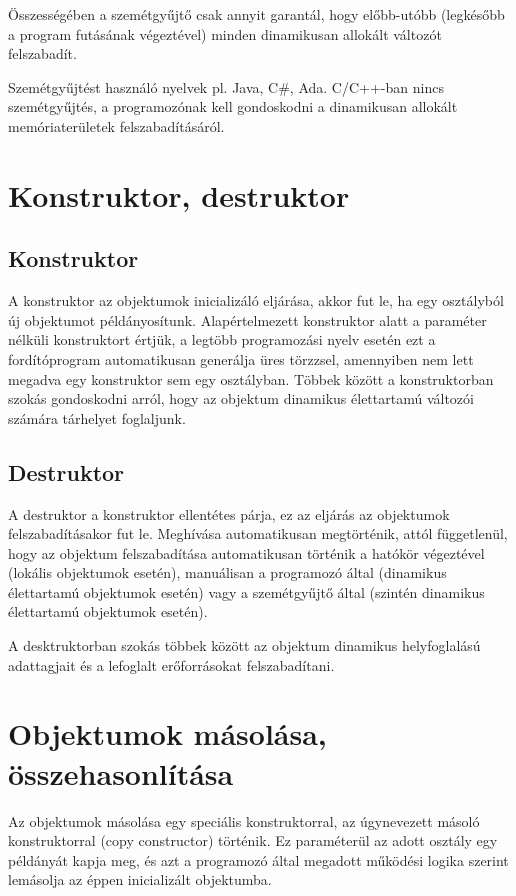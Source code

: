 \documentclass[margin=0px]{article}
\begin{document}
	Összességében a szemétgyűjtő csak annyit garantál, hogy előbb-utóbb (legkésőbb a program futásának végeztével) minden dinamikusan allokált változót felszabadít.
	
	Szemétgyűjtést használó nyelvek pl. Java, C\#, Ada. C/C++-ban nincs szemétgyűjtés, a programozónak kell gondoskodni a dinamikusan allokált memóriaterületek felszabadításáról.
	\section{Konstruktor, destruktor}

	\subsection{Konstruktor}
	
	A konstruktor az objektumok inicializáló eljárása, akkor fut le, ha egy osztályból új objektumot példányosítunk. Alapértelmezett konstruktor alatt a paraméter nélküli konstruktort értjük, a legtöbb programozási nyelv esetén ezt a fordítóprogram automatikusan generálja üres törzzsel, amennyiben nem lett megadva egy konstruktor sem egy osztályban.
	Többek között a konstruktorban szokás gondoskodni arról, hogy az objektum dinamikus élettartamú változói számára tárhelyet foglaljunk.
	
	\subsection{Destruktor}
	
	A destruktor a konstruktor ellentétes párja, ez az eljárás az objektumok felszabadításakor fut le. Meghívása automatikusan megtörténik, attól függetlenül, hogy az objektum felszabadítása automatikusan történik a hatókör végeztével (lokális objektumok esetén), manuálisan a programozó	által (dinamikus élettartamú objektumok esetén) vagy a szemétgyűjtő által (szintén dinamikus élettartamú objektumok esetén).
	
	A desktruktorban szokás többek között az objektum dinamikus helyfoglalású adattagjait és a lefoglalt erőforrásokat felszabadítani.
	
	\section{Objektumok másolása, összehasonlítása}
	
	Az objektumok másolása egy speciális konstruktorral, az úgynevezett másoló konstruktorral (copy constructor) történik. Ez paraméterül az adott osztály egy példányát kapja meg, és azt a programozó által megadott működési logika szerint lemásolja az éppen inicializált objektumba.
	
\end{document}

